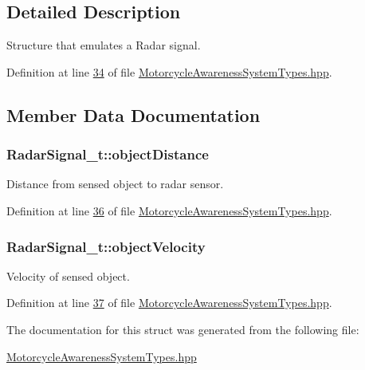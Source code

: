 \subsection{Detailed Description}
Structure that emulates a Radar signal. 

Definition at line \hyperlink{MotorcycleAwarenessSystemTypes_8hpp_source_l00034}{34} of file \hyperlink{MotorcycleAwarenessSystemTypes_8hpp_source}{Motorcycle\-Awareness\-System\-Types.\-hpp}.



\subsection{Member Data Documentation}
\hypertarget{structRadarSignal__t_a96938fbfb77f208743a36d3f8b37cccb}{
\subsubsection[{object\-Distance}]{ Radar\-Signal\-\_\-t\-::object\-Distance}}\label{structRadarSignal__t_a96938fbfb77f208743a36d3f8b37cccb}


Distance from sensed object to radar sensor. 



Definition at line \hyperlink{MotorcycleAwarenessSystemTypes_8hpp_source_l00036}{36} of file \hyperlink{MotorcycleAwarenessSystemTypes_8hpp_source}{Motorcycle\-Awareness\-System\-Types.\-hpp}.

\hypertarget{structRadarSignal__t_a0bbaf402c80288a0819dbbfaded8a44a}{
\subsubsection[{object\-Velocity}]{ Radar\-Signal\-\_\-t\-::object\-Velocity}}\label{structRadarSignal__t_a0bbaf402c80288a0819dbbfaded8a44a}


Velocity of sensed object. 



Definition at line \hyperlink{MotorcycleAwarenessSystemTypes_8hpp_source_l00037}{37} of file \hyperlink{MotorcycleAwarenessSystemTypes_8hpp_source}{Motorcycle\-Awareness\-System\-Types.\-hpp}.



The documentation for this struct was generated from the following file\-:\begin{DoxyCompactItemize}
\item 
\hyperlink{MotorcycleAwarenessSystemTypes_8hpp}{Motorcycle\-Awareness\-System\-Types.\-hpp}\end{DoxyCompactItemize}

